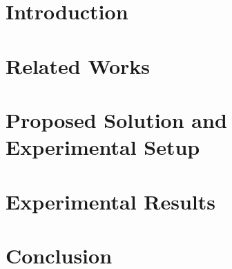 \documentclass[a4paper,12pt,oneside]{book}
\theoremstyle{definition}
\theoremstyle{definition}
\newcommand\blankpage{%
	\clearpage
	\thispagestyle{plain}
	\null
	\newpage}
\begin{document}

	\tableofcontents
	\listoftables
	\listoffigures	
	
	\onehalfspacing
	\frontmatter	{\tiny }
	\mainmatter
		
	\chapter{Introduction}
	\label{cap:chapter1}
	
	
	\chapter{Related Works}
	\label{cap:chapter2}
	
	
	\chapter{Proposed Solution and Experimental Setup}
	\label{cap:chapter3}
	
	
	\chapter{Experimental Results}
	\label{cap:chapter5}
	
	
	\chapter{Conclusion}
	\label{cap:chapter6}
	

	\blankpage
	

	 
	
	
\end{document}
